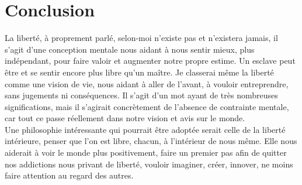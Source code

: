 \documentclass[twocolumn, french]{article}
\begin{document}
\section*{Conclusion}
La liberté, à proprement parlé, selon-moi n'existe pas et n'existera jamais, il s'agit d'une 
conception mentale nous aidant à nous sentir mieux, plus indépendant, pour faire valoir et augmenter 
notre propre estime. Un esclave peut être et se sentir encore plus libre qu'un maître. Je classerai
même la liberté comme une vision de vie, nous aidant à aller de l'avant, à vouloir entreprendre,
sans jugements ni conséquences. Il s'agit d'un mot ayant de très nombreuses significations, mais
il s'agirait concrètement de l'absence de contrainte mentale, car tout ce passe réellement dans 
notre vision et avis sur le monde. \\ Une philosophie intéressante qui pourrait être adoptée 
serait celle de la liberté intérieure, penser que l'on est libre, chacun, à l'intérieur de nous 
même. Elle nous aiderait à voir le monde plus positivement, faire un premier pas afin de quitter
nos addictions nous privant de liberté, vouloir imaginer, créer, innover, ne moins faire attention
au regard des autres.
\end{document}
